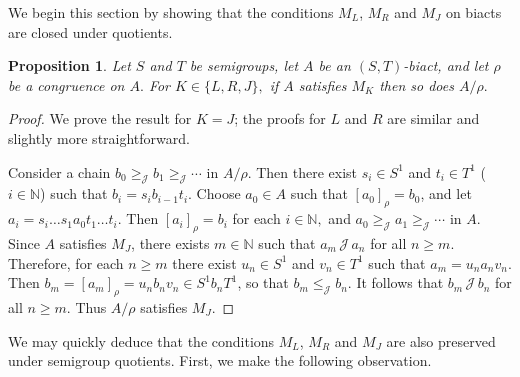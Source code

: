 \documentclass[twoside,a4paper,12pt,reqno]{amsart}
\theoremstyle{plain}
\newtheorem{prop}[thm]{Proposition}
\theoremstyle{definition}
\renewcommand{\j}{\mbox{${\mathcal{J}}$}}
\renewcommand{\k}{\mbox{${\mathcal{K}}$}}
\newcommand{\leqj}{\leq_{\mathcal{J}}}
\newcommand{\geqj}{\geq_{\mathcal{J}}}
\newcommand{\leqk}{\leq_{\mathcal{K}}}
\renewcommand{\a}{\alpha}
\renewcommand{\b}{\beta}
\renewcommand{\th}{\theta}
\newcommand{\N}{\mathbb{N}}
\renewcommand{\th}{\theta}
\begin{document}
%

We begin this section by showing that the conditions $M_L$, $M_R$ and $M_J$ on biacts are closed under quotients.

\begin{prop}\label{prop:actquotient}
Let $S$ and $T$ be semigroups, let $A$ be an $(S,T)$-biact, and let $\rho$ be a congruence on $A.$  For $K\in\{L,R,J\},$ if $A$ satisfies $M_K$ then so does $A/\rho.$
\end{prop}

\begin{proof}
We prove the result for $K=J$; the proofs for $L$ and $R$ are similar and slightly more straightforward.

Consider a chain $b_0\geqj b_1\geqj\cdots$ in $A/\rho.$  Then there exist $s_i\in S^1$ and $t_i\in T^1$ ($i\in\N$) such that $b_i=s_ib_{i-1}t_i$.  Choose $a_0\in A$ such that $[a_0]_{\rho}=b_0$, and let $a_i=s_i\dots s_1a_0t_1\dots t_i$.
Then $[a_i]_{\rho}=b_i$ for each $i\in\N,$ and $a_0\geqj a_1\geqj\cdots$ in $A.$  Since $A$ satisfies $M_J$, there exists $m\in\N$ such that $a_m\,\j\,a_n$ for all $n\geq m.$  Therefore, for each $n\geq m$ there exist $u_n\in S^1$ and $v_n\in T^1$ such that $a_m=u_na_nv_n$.  Then $b_m=[a_m]_{\rho}=u_nb_nv_n\in S^1b_nT^1$, so that $b_m\leqj b_n$.  It follows that $b_m\,\j\,b_n$ for all $n\geq m.$  Thus $A/\rho$ satisfies $M_J$.
\end{proof}

We may quickly deduce that the conditions $M_L$, $M_R$ and $M_J$ are also preserved under semigroup quotients.  First, we make the following observation.
\end{document}
